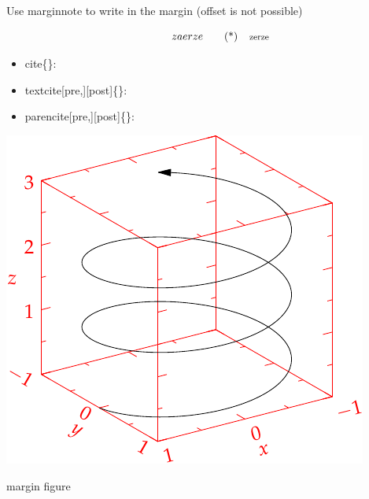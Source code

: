     \vspace{2em}


        Use marginnote to write in the margin (offset is not possible)

    \vspace{2em}
    \begin{equation}
        zaerze
        \mathnote{zerze}
    \end{equation}

    \vspace{2em}


    \begin{itemize}
        \item \textsf{cite\{\}}: \cite{Tufte2006}
        \item \textsf{textcite[pre,][post]\{\}}: \textcite[pre,][post]{Tufte2006,Tufte1990,Bringhurst2005}
        \item \textsf{parencite[pre,][post]\{\}}: \parencite[pre,][post]{Tufte2006,Tufte1990,Bringhurst2005}
    \end{itemize}

    \lipsum[1]

    \begin{marginfigure}%
    \includegraphics[width=\linewidth]{images/helix.pdf}
    \caption{margin figure}
    \label{app:fig:margin_fig}
    \end{marginfigure}


